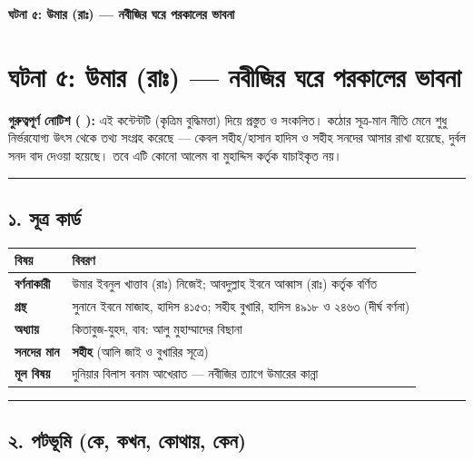 

\begin{center}{\Large\bfseries\color{emerald} ঘটনা ৫: উমার (রাঃ) — নবীজির ঘরে পরকালের ভাবনা}\end{center}
\vspace{1em}
\section*{ঘটনা ৫: উমার (রাঃ) — নবীজির ঘরে পরকালের ভাবনা}

\begin{warnbox}
 \textbf{গুরুত্বপূর্ণ নোটিশ ( ):} এই কন্টেন্টটি  (কৃত্রিম বুদ্ধিমত্তা) দিয়ে প্রস্তুত ও সংকলিত।  কঠোর সূত্র-মান নীতি মেনে শুধু নির্ভরযোগ্য উৎস থেকে তথ্য সংগ্রহ করেছে — কেবল সহীহ/হাসান হাদিস ও সহীহ সনদের আসার রাখা হয়েছে, দুর্বল সনদ বাদ দেওয়া হয়েছে। তবে এটি কোনো আলেম বা মুহাদ্দিস কর্তৃক যাচাইকৃত নয়।
\end{warnbox}


\medskip\hrule\medskip

\subsection*{১. সূত্র কার্ড}

\begin{table}[h]\centering\small
\begin{tabular}{ll}
বিষয় & বিবরণ \\
\hline
\textbf{বর্ণনাকারী} & উমার ইবনুল খাত্তাব (রাঃ) নিজেই; আবদুল্লাহ ইবনে আব্বাস (রাঃ) কর্তৃক বর্ণিত \\
\textbf{গ্রন্থ} & সুনানে ইবনে মাজাহ, হাদিস ৪১৫৩; সহীহ বুখারি, হাদিস ৪৯১৮ ও ২৪৬৩ (দীর্ঘ বর্ণনা) \\
\textbf{অধ্যায়} & কিতাবুজ-যুহদ, বাব: আলু মুহাম্মাদের বিছানা \\
\textbf{সনদের মান} & \textbf{সহীহ} (আলি জাই ও বুখারির সূত্রে) \\
\textbf{মূল বিষয়} & দুনিয়ার বিলাস বনাম আখেরাত — নবীজির ত্যাগে উমারের কান্না \\
\hline
\end{tabular}
\end{table}

\medskip\hrule\medskip

\subsection*{২. পটভূমি (কে, কখন, কোথায়, কেন)}

